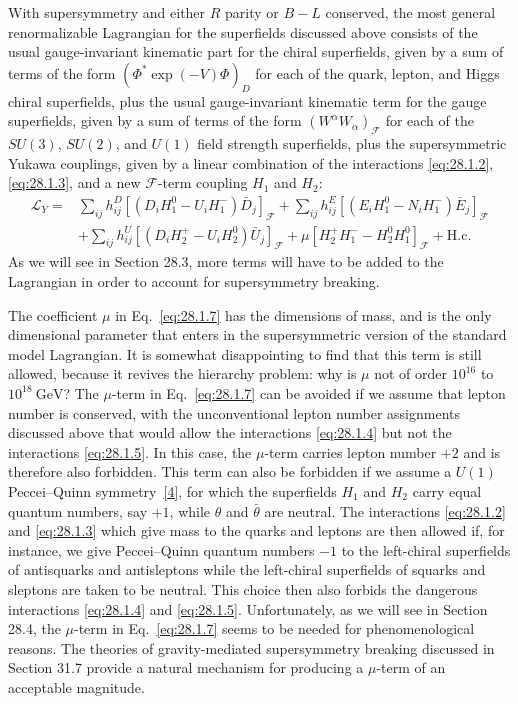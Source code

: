 With supersymmetry and either \(R\) parity or \(B-L\) conserved, the
most general renormalizable Lagrangian for the superfields discussed
above consists of the usual gauge-invariant kinematic part for the
chiral superfields, given by a sum of terms of the form
\((\Phi^*\exp(-V)\Phi)_D\) for each of the quark, lepton, and Higgs
chiral superfields, plus the usual gauge-invariant kinematic term for
the gauge superfields, given by a sum of terms of the form
\((W^\alpha W_\alpha)_{\mathcal{F}}\) for each of
the \(SU(3)\), \(SU(2)\), and \(U(1)\) field strength superfields, plus
the supersymmetric Yukawa couplings, given by a linear combination of
the interactions \eqref{eq:28.1.2}, \eqref{eq:28.1.3}, and a new
\(\mathcal{F}\)-term coupling \(H_1\) and \(H_2\):
\begin{equation}
  \begin{aligned}
  \mathcal{L}_Y={}&
  \sum_{ij}h_{ij}^{D}
    \left[(D_iH_1^0-U_iH_1^-)\bar D_j\right]_{\mathcal{F}}
  +\sum_{ij}h_{ij}^{E}
    \left[(E_iH_1^0-N_iH_1^-)\bar E_j\right]_{\mathcal{F}}
  \\
  &+\sum_{ij}h_{ij}^{U}
    \left[(D_iH_2^+-U_iH_2^0)\bar U_j\right]_{\mathcal{F}}
  +\mu\left[H_2^+H_1^- -H_2^0H_1^0\right]_{\mathcal{F}}
  +\mathrm{H.c.}
  \end{aligned}
  \tag{28.1.7}\label{eq:28.1.7}
\end{equation}
As we will see in Section 28.3, more terms will have to be added to the
Lagrangian in order to account for supersymmetry breaking.

The coefficient \(\mu\) in Eq.~\eqref{eq:28.1.7} has the dimensions of
mass, and is the only dimensional parameter that enters in the
supersymmetric version of the standard model Lagrangian. It is somewhat
disappointing to find that this term is still allowed, because it
revives the hierarchy problem: why is \(\mu\) not of order \(10^{16}\)
to \(10^{18}\ \mathrm{GeV}\)? The \(\mu\)-term in
Eq.~\eqref{eq:28.1.7} can be avoided if we assume that lepton number is
conserved, with the unconventional lepton number assignments discussed
above that would allow the interactions \eqref{eq:28.1.4} but not the
interactions \eqref{eq:28.1.5}. In this case, the \(\mu\)-term carries
lepton number \(+2\) and is therefore also forbidden. This term can also
be forbidden if we assume a \(U(1)\) Peccei--Quinn
symmetry~\hyperref[ch28-ref-4]{[4]}, for which the superfields \(H_1\)
and \(H_2\) carry equal quantum numbers, say \(+1\), while \(\theta\)
and \(\bar\theta\) are neutral. The interactions \eqref{eq:28.1.2} and
\eqref{eq:28.1.3} which give mass to the quarks and leptons are then
allowed if, for instance, we give Peccei--Quinn quantum numbers \(-1\)
to the left-chiral superfields of antisquarks and antisleptons while the
left-chiral superfields of squarks and sleptons are taken to be neutral.
This choice then also forbids the dangerous interactions
\eqref{eq:28.1.4} and \eqref{eq:28.1.5}. Unfortunately, as we will see
in Section 28.4, the \(\mu\)-term in Eq.~\eqref{eq:28.1.7} seems to be
needed for phenomenological reasons. The theories of gravity-mediated
supersymmetry breaking discussed in Section 31.7 provide a natural
mechanism for producing a \(\mu\)-term of an acceptable magnitude.

